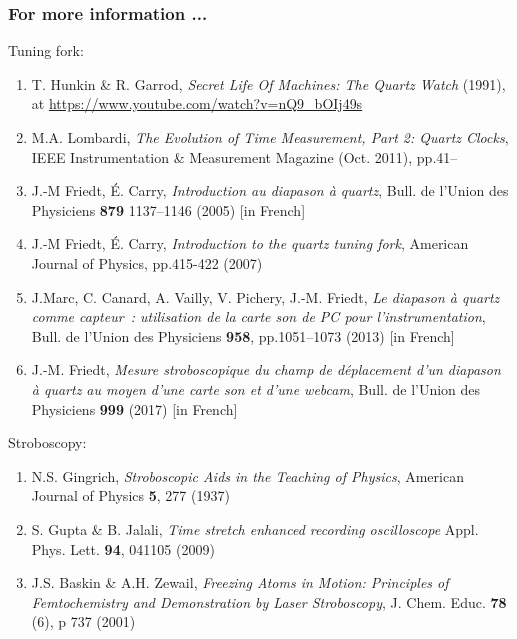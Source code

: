 \documentclass[compress,10pt,aspectratio=169]{beamer}
\begin{document}
\begin{frame}[fragile]\frametitle{For more information ...}

\vspace{-0.1cm}
Tuning fork:
{\footnotesize
\begin{enumerate}
\item T. Hunkin \& R. Garrod, {\em Secret Life Of Machines:
The Quartz Watch} (1991), at \url{https://www.youtube.com/watch?v=nQ9_bOIj49s}
\item M.A. Lombardi, {\em The Evolution of Time Measurement, Part 2: Quartz Clocks},
IEEE Instrumentation \& Measurement Magazine (Oct. 2011), pp.41--
\item J.-M Friedt, \'E. Carry, {\em Introduction au diapason \`a quartz}, Bull. de l'Union des Physiciens {\bf 879} 1137--1146 (2005) [in French]
\item J.-M Friedt, \'E. Carry, {\em Introduction to the quartz tuning fork}, American Journal of 
Physics, pp.415-422 (2007)
\item J.Marc, C. Canard, A. Vailly, V. Pichery, J.-M. Friedt, {\em Le diapason \`a quartz comme 
capteur~: utilisation de la carte son de PC pour l'instrumentation}, Bull. de l'Union des Physiciens {\bf 958}, pp.1051--1073 (2013) [in French]
\item J.-M. Friedt, {\em Mesure stroboscopique du champ de d\'eplacement d'un diapason \`a quartz 
au moyen d'une carte son et d'une webcam}, Bull. de l'Union des Physiciens {\bf 999} (2017) [in French]
\end{enumerate}
}

Stroboscopy:
{\footnotesize
\begin{enumerate}
\item N.S. Gingrich, {\em Stroboscopic Aids in the Teaching of Physics}, American Journal of 
Physics {\bf 5}, 277 (1937)
\item S. Gupta \& B. Jalali, {\em Time stretch enhanced recording oscilloscope}
Appl. Phys. Lett. {\bf 94}, 041105 (2009)
\item J.S. Baskin \& A.H. Zewail, {\em Freezing Atoms in Motion: Principles of 
Femtochemistry and Demonstration by Laser Stroboscopy}, J. Chem. Educ. {\bf 
78} (6), p 737 (2001)
\end{enumerate}
}
\end{frame}
\end{document}
